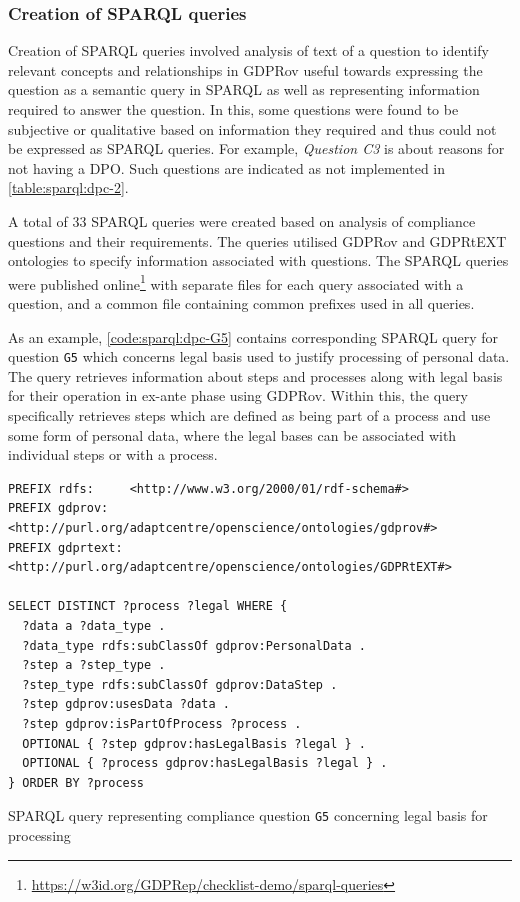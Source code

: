 \subsubsection{Creation of SPARQL queries}
Creation of SPARQL queries involved analysis of text of a question to identify relevant concepts and relationships in GDPRov useful towards expressing the question as a semantic query in SPARQL as well as representing information required to answer the question.
In this, some questions were found to be subjective or qualitative based on information they required and thus could not be expressed as SPARQL queries. For example, \textit{Question C3} is about reasons for not having a DPO. Such questions are indicated as not implemented in \autoref{table:sparql:dpc-2}.

A total of 33 SPARQL queries were created based on analysis of compliance questions and their requirements.
The queries utilised GDPRov and GDPRtEXT ontologies to specify information associated with questions.
The SPARQL queries were published online\footnote{\url{https://w3id.org/GDPRep/checklist-demo/sparql-queries}}
with separate files for each query associated with a question, and a common file containing common prefixes used in all queries.

As an example, \autoref{code:sparql:dpc-G5} contains corresponding SPARQL query for question \texttt{G5} which concerns legal basis used to justify processing of personal data. 
The query retrieves information about steps and processes along with legal basis for their operation in ex-ante phase using GDPRov.
Within this, the query specifically retrieves steps which are defined as being part of a process and use some form of personal data, where the legal bases can be associated with individual steps or with a process.
\begin{listing}[htbp]
\begin{verbatim}
PREFIX rdfs:     <http://www.w3.org/2000/01/rdf-schema#>
PREFIX gdprov:   <http://purl.org/adaptcentre/openscience/ontologies/gdprov#>
PREFIX gdprtext: <http://purl.org/adaptcentre/openscience/ontologies/GDPRtEXT#>

SELECT DISTINCT ?process ?legal WHERE {
  ?data a ?data_type .
  ?data_type rdfs:subClassOf gdprov:PersonalData .
  ?step a ?step_type .
  ?step_type rdfs:subClassOf gdprov:DataStep .
  ?step gdprov:usesData ?data . 
  ?step gdprov:isPartOfProcess ?process .
  OPTIONAL { ?step gdprov:hasLegalBasis ?legal } .
  OPTIONAL { ?process gdprov:hasLegalBasis ?legal } .
} ORDER BY ?process
\end{verbatim}
\caption{SPARQL query representing compliance question \texttt{G5} concerning legal basis for processing}
\label{code:sparql:dpc-G5}
\end{listing}

